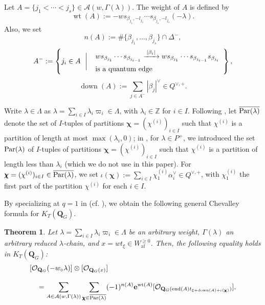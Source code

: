 \documentclass[11pt,a4paper,reqno,dvipdfmx]{amsart}
\numberwithin{equation}{section}
\newcommand{\BZ}{\mathbb{Z}}
\newcommand{\CA}{\mathcal{A}}
\newcommand{\CO}{\mathcal{O}}
\newcommand{\vpi}{\varpi}
\newcommand{\be}{\mathbf{e}}
\DeclareMathOperator{\wt}{wt}
\DeclareMathOperator{\ed}{end}
\DeclareMathOperator{\dnn}{down}
\newcommand{\af}{\mathrm{af}}
\newcommand{\edge}[1]{ \xrightarrow{\hspace{2pt}#1\hspace{2pt}} }
\newcommand{\lng}{w_{\circ}}
\newcommand{\ti}[1]{\widetilde{#1}}
\newcommand{\ol}[1]{\overline{#1}}
\newcommand{\QG}{\mathbf{Q}_{G}}
\newcommand{\LQG}[1]{[\CO_{\QG}(#1)]}
\newcommand{\SQG}[1]{[\CO_{\QG(#1)}]}
\newcommand{\bchi}{\pmb{\chi}}
\newcommand{\Par}{\mathop{\rm Par}\nolimits}
\theoremstyle{plain}
\newtheorem{thm}[lem]{Theorem}
\theoremstyle{definition}
\theoremstyle{remark}
\begin{document}
Let $A=\{ j_1 < \cdots < j_s\} \in \CA(w,\Gamma(\lambda))$. 
The weight of $A$ is defined by 
%
	\begin{equation} \label{eq:wta}
	\wt(A):=-w s_{\beta_{j_1},-l_{j_1}} \cdots s_{\beta_{j_s},-l_{j_s}}(-\lambda).
	\end{equation}
%
Also, we set 
%
\begin{equation} \label{eq:nA}
n(A):=\# \{ \beta_{j_1},\ldots,\beta_{j_s} \} \cap \Delta^{-}, 
\end{equation}
%
\begin{equation} \label{eq:A-}
A^{-}:=\left\{j_i \in A \ \biggm| \ 
\begin{array}{l}
\text{%
$ws_{\beta_{j_1}} \cdots s_{\beta_{j_{i-1}}} \edge{|\beta_i|}
 ws_{\beta_{j_1}} \cdots s_{\beta_{j_{i-1}}}s_{\beta_{j_{i}}}$} \\[2mm]
\text{is a quantum edge}
\end{array} \right\}, 
\end{equation}
%
\begin{equation} \label{def:height}
\dnn(A):=\sum_{j\in A^-}|\beta_j|^\vee\in Q^{\vee,+}.
\end{equation}

Write $\lambda \in \Lambda$ as $\lambda=\sum_{i\in I}\lambda_i\vpi_i \in \Lambda$, 
with $\lambda_{i} \in \BZ$ for $i \in I$. Following \cite[Section 4.1]{LNS}, 
let $\ol{\Par(\lambda)}$ denote the set of $I$-tuples of partitions 
$\bchi=(\chi^{(i)})_{i\in I}$ such that $\chi^{(i)}$ is a partition of 
length at most $\max(\lambda_i,0)$; in \cite[Section 2.5]{NSZ}, for $\lambda \in P^{+}$, 
we introduced the set $\Par(\lambda)$ of $I$-tuples of partitions $\bchi=(\chi^{(i)})_{i\in I}$ 
such that $\chi^{(i)}$ is a partition of length less than $\lambda_i$ 
(which we do not use in this paper).
%
For $\bchi = (\chi^{(i)})_{i \in I} \in \ol{\Par(\lambda)}$, 
we set $\iota(\bchi) := \sum_{i \in I} \chi^{(i)}_1 \alpha_i^{\vee} \in Q^{\vee,+}$, 
with $\chi^{(i)}_1$ the first part of the partition $\chi^{(i)}$ for each $i \in I$.

By specializing at $q = 1$ in \cite[Theorem~33]{LNS} (cf. \cite[Theorem~5.16]{KoLN}), 
we obtain the following general Chevalley formula for $K_{T}(\QG)$. 
%
%
\begin{thm} \label{thm:genchev} 
Let $\lambda=\sum_{i\in I}\lambda_i\vpi_i \in \Lambda$ be an arbitrary weight, 
$\Gamma(\lambda)$ an arbitrary reduced $\lambda$-chain, 
and $x=wt_{\xi}\in W_{\af}^{\ge 0}$. 
Then, the following equality holds in $K_{T}(\QG)${\rm :}
%
\begin{align}
& \LQG{-\lng \lambda} \otimes \SQG{x} \nonumber \\[3mm]
& \quad = \sum_{A \in \CA(w,\Gamma(\lambda))}
  \sum_{ \bchi \in \ol{\Par(\lambda)} }
  (-1)^{n(A)} \be^{\wt(A)}
  \SQG{ \ed(A)t_{\xi+\dnn(A)+\iota(\bchi)} }. \label{eq:gchev-org}
\end{align}
%
\end{thm}
\end{document}
